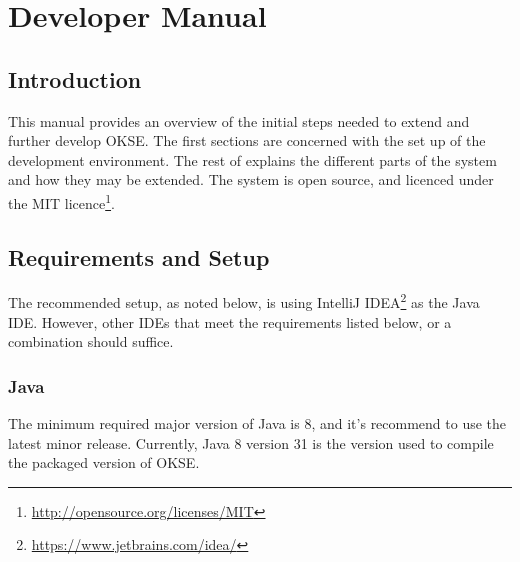 
 
 
\lstset{style=mystyle}

\chapter{Developer Manual}
\label{appendix-developer-manual}

\section{Introduction}

This manual provides an overview of the initial steps needed to extend and further develop OKSE. The first sections are concerned with the set up of the development environment. The rest of explains the different parts of the system and how they may be extended. The system is open source, and licenced under the MIT licence\footnote{\url{http://opensource.org/licenses/MIT}}.

\section{Requirements and Setup}
The recommended setup, as noted below, is using IntelliJ IDEA\footnote{\url{https://www.jetbrains.com/idea/}} as the Java IDE. However, other IDEs that meet the requirements listed below, or a combination should suffice. 

\subsection{Java}
The minimum required major version of Java is 8, and it's recommend to use the latest minor release. Currently, Java 8 version 31 is the version used to compile the packaged version of OKSE.

